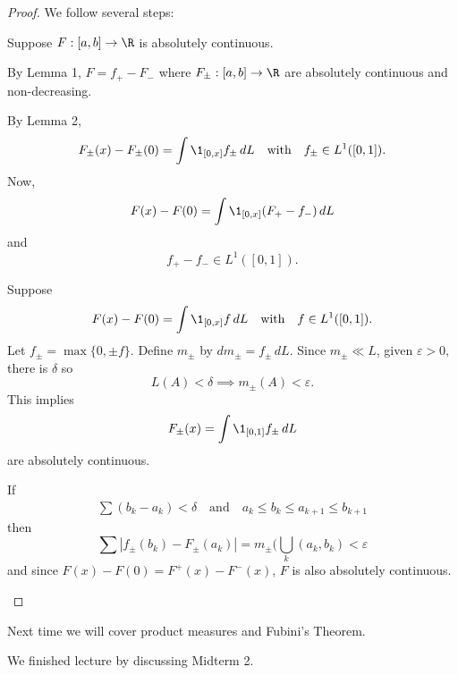 \begin{proof} We follow several steps:
	\begin{steps}
		\item
			Suppose $F : [a,b] \to \R$ is absolutely continuous.

			\noindent By Lemma 1, $F = f_{+} - F_{-}$ where
			$F_{\pm} : [a,b] \to \R$ are absolutely continuous and non-decreasing.

			\noindent By Lemma 2,
			\[
				F_{\pm}(x) - F_{\pm} (0) = \int \1_{[0,x]} f_{\pm} \, dL \quad \text{with} \quad f_{\pm} \in L^1([0,1]).
			\]
			Now,
			\[
				F(x) - F(0) = \int \1_{[0,x]} (F_{+} - f_{-} ) \, dL
			\]
			and
			\[
				f_{+} - f_{-} \in L^1([0,1]).
			\]

		\item
			Suppose
			\[
					F(x) - F(0) = \int \1_{[0,x]} f \, dL \quad \text{with} \quad f \in L^1([0,1]).
			\]
			Let $f_{\pm} = \max\{0, \pm f\}$.
			Define $m_{\pm}$ by $dm_{\pm} = f_{\pm} \, dL$.
			Since $m_{\pm} \ll L$, given $\varepsilon > 0,$ there is $\delta$ so
			\[
				L(A) < \delta \implies m_{\pm}(A) < \varepsilon.
			\]
			This implies
			\[
				F_{\pm}(x) = \int \1_{[0,1]} f_{\pm} \, dL
			\]
			are absolutely continuous.

			If
			\begin{align*}
				\sum (b_k - a_k) < \delta \quad\text{and} \quad
				a_{k} \leq b_k \leq a_{k+1} \leq b_{k+1}
			\end{align*}
			then
			 \[
				\sum | f_{\pm}(b_k) - F_{\pm}(a_k) | = m_{\pm} ( \bigcup_{k} (a_k, b_k) < \varepsilon
			\]
			and since $F(x) - F(0) = F^{+} (x) - F^{-} (x)$,
			$F$ is also absolutely continuous.
	\end{steps}

\end{proof}

Next time we will cover product measures and Fubini's Theorem.

We finished lecture by discussing Midterm 2.
